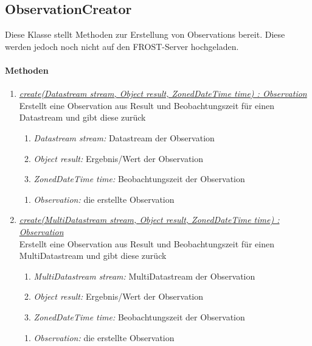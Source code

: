 
\subsection{ObservationCreator}

Diese Klasse stellt Methoden zur Erstellung von Observations bereit.
Diese werden jedoch noch nicht auf den FROST-Server hochgeladen.

\paragraph{Methoden}

\begin{enumerate}[+]

	\item \underline{\textit{create(Datastream stream, Object result, ZonedDateTime time) : Observation}} \\
	Erstellt eine Observation aus Result und Beobachtungszeit für einen Datastream und gibt diese zurück	
	\begin{enumerate}[$\bullet$]
		\item \textit{Datastream stream:} Datastream der Observation
		\item \textit{Object result:} Ergebnis/Wert der Observation
		\item \textit{ZonedDateTime time:} Beobachtungszeit der Observation
	\end{enumerate}
	\vspace{-0.2cm}
	\begin{enumerate}[$\circ$]
		\item \textit{Observation:} die erstellte Observation
	\end{enumerate}
	
	\item \underline{\textit{create(MultiDatastream stream, Object result, ZonedDateTime time) : Observation}} \\
	Erstellt eine Observation aus Result und Beobachtungszeit für einen MultiDatastream und gibt diese zurück	
	\begin{enumerate}[$\bullet$]
		\item \textit{MultiDatastream stream:} MultiDatastream der Observation
		\item \textit{Object result:} Ergebnis/Wert der Observation
		\item \textit{ZonedDateTime time:} Beobachtungszeit der Observation
	\end{enumerate}
	\vspace{-0.2cm}
	\begin{enumerate}[$\circ$]
		\item \textit{Observation:} die erstellte Observation
	\end{enumerate}
	

\end{enumerate}
